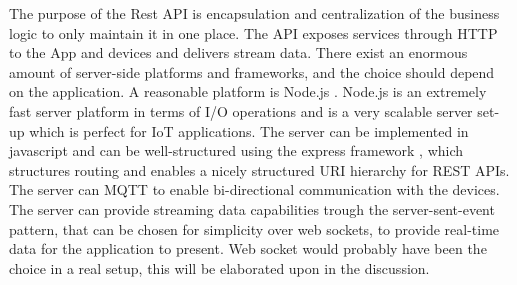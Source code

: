The purpose of the Rest API is encapsulation and centralization of the business logic to only maintain it in one place. The API exposes services through HTTP to the App and devices and delivers stream data. There exist an enormous amount of server-side platforms and frameworks, and the choice should depend on the application. A reasonable platform is Node.js \cite{node}. Node.js is an extremely fast server platform in terms of I/O operations and is a very scalable server set-up which is perfect for IoT applications. The server can be implemented in javascript and can be well-structured using the express framework \cite{express}, which structures routing and enables a nicely structured URI hierarchy for REST APIs. The server can MQTT to enable bi-directional communication with the devices. The server can provide streaming data capabilities trough the server-sent-event pattern, that can be chosen for simplicity over web sockets, to provide real-time data for the application to present. Web socket would probably have been the choice in a real setup, this will be elaborated upon in the discussion.